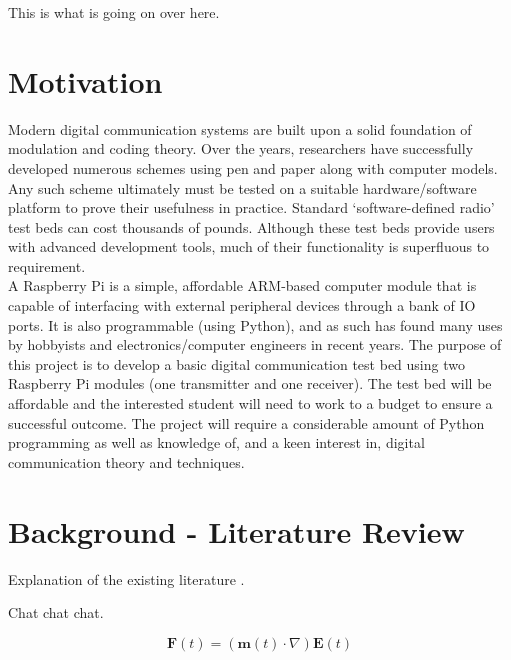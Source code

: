 \documentclass[../main.tex]{subfiles}
\begin{document}
This is what is going on over here.


\section{Motivation}
Modern digital communication systems are built upon a solid foundation of modulation and coding theory.
Over the years, researchers have successfully developed numerous schemes using pen and paper along with computer models.
Any such scheme ultimately must be tested on a suitable hardware/software platform to prove their usefulness in practice.
Standard ‘software-defined radio’ test beds can cost thousands of pounds.
Although these test beds provide users with advanced development tools, much of their functionality is superfluous to requirement.\\

A Raspberry Pi is a simple, affordable ARM-based computer module that is capable of interfacing with external peripheral devices through a bank of IO ports.
It is also programmable (using Python), and as such has found many uses by hobbyists and electronics/computer engineers in recent years.
The purpose of this project is to develop a basic digital communication test bed using two Raspberry Pi modules (one transmitter and one receiver).
The test bed will be affordable and the interested student will need to work to a budget to ensure a successful outcome.
The project will require a considerable amount of Python programming as well as knowledge of, and a keen interest in, digital communication theory and techniques.


\section{Background - Literature Review}
Explanation of the existing literature \cite{DhirNIPS2017}.



Chat chat chat.

\begin{equation} \label{bla}
\textbf{F}(t) = (\textbf{m}(t)\cdot\nabla)\textbf{E}(t)
\end{equation}
\end{document}
